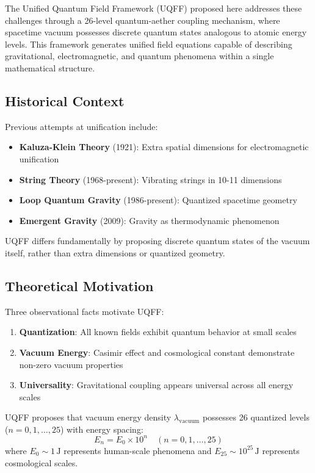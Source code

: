 \documentclass[12pt,a4paper]{article}
\begin{document}
The Unified Quantum Field Framework (UQFF) proposed here addresses these challenges through a 26-level quantum-aether coupling mechanism, where spacetime vacuum possesses discrete quantum states analogous to atomic energy levels. This framework generates unified field equations capable of describing gravitational, electromagnetic, and quantum phenomena within a single mathematical structure.

\subsection{Historical Context}

Previous attempts at unification include:
\begin{itemize}
    \item \textbf{Kaluza-Klein Theory} (1921): Extra spatial dimensions for electromagnetic unification \cite{Kaluza1921}
    \item \textbf{String Theory} (1968-present): Vibrating strings in 10-11 dimensions \cite{Polchinski1998}
    \item \textbf{Loop Quantum Gravity} (1986-present): Quantized spacetime geometry \cite{Rovelli2004}
    \item \textbf{Emergent Gravity} (2009): Gravity as thermodynamic phenomenon \cite{Verlinde2011}
\end{itemize}

UQFF differs fundamentally by proposing discrete quantum states of the vacuum itself, rather than extra dimensions or quantized geometry.

\subsection{Theoretical Motivation}

Three observational facts motivate UQFF:
\begin{enumerate}
    \item \textbf{Quantization}: All known fields exhibit quantum behavior at small scales
    \item \textbf{Vacuum Energy}: Casimir effect and cosmological constant demonstrate non-zero vacuum properties
    \item \textbf{Universality}: Gravitational coupling appears universal across all energy scales
\end{enumerate}

UQFF proposes that vacuum energy density $\lambda_{\text{vacuum}}$ possesses 26 quantized levels ($n = 0, 1, \ldots, 25$) with energy spacing:
\begin{equation}
E_n = E_0 \times 10^n \quad (n = 0, 1, \ldots, 25)
\label{eq:energy_levels}
\end{equation}
where $E_0 \sim 1\,\text{J}$ represents human-scale phenomena and $E_{25} \sim 10^{25}\,\text{J}$ represents cosmological scales.
\end{document}

